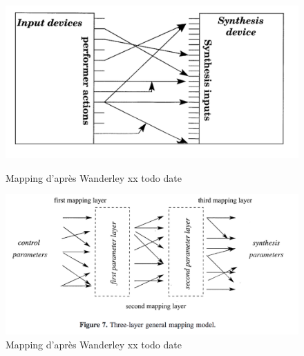 \begin{figure}[!htbp]
	\captionsetup{format=plain}%
	\centering
	\begin{minipage}[t]{0.48\textwidth}
		\includegraphics[width=\linewidth]{gfx/04_algorithms/Wanderley_Schema1.png}
		\caption[Représentation du mapping \#1]{Mapping d'après Wanderley xx todo date}
		\label{fig:algorithms:DynamicMappingLayer1}
	\end{minipage}
	\hspace{.02\linewidth}
	\begin{minipage}[t]{0.48\textwidth}
	  \includegraphics[width=\linewidth]{gfx/04_algorithms/Wanderley_Schema2.png}
		\caption[Représentation du mapping \#2]{Mapping d'après Wanderley xx todo date}
		\label{fig:algorithms:DynamicMappingLayer2}
	\end{minipage}
\end{figure}

